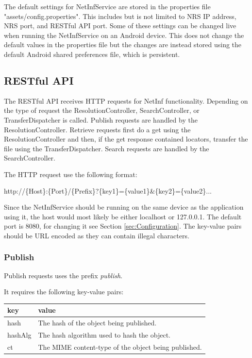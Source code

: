 The default settings for NetInfService are stored in the properties file "assets/config.properties". This includes but is not limited to NRS IP address, NRS port, and RESTful API port. Some of these settings can be changed live when running the NetInfService on an Android device. This does not change the default values in the properties file but the changes are instead stored using the default Android shared preferences file, which is persistent.

\subsection{RESTful API}
\label{sec:RESTful API}

The RESTful API receives HTTP requests for NetInf functionality. Depending on the type of request the ResolutionController, SearchController, or TransferDispatcher is called. Publish requests are handled by the ResolutionController. Retrieve requests first do a get using the ResolutionController and then, if the get response contained locators, transfer the file using the TransferDispatcher. Search requests are handled by the SearchController.

The HTTP request use the following format:

\begin{center}
http://\{Host\}:\{Port\}/\{Prefix\}?\{key1\}=\{value1\}\&\{key2\}=\{value2\}...
\end{center}

Since the NetInfService should be running on the same device as the application using it, the host would most likely be either localhost or 127.0.0.1. The default port is 8080, for changing it see Section \ref{sec:Configuration}. The key-value pairs should be URL encoded as they can contain illegal characters.

\subsubsection{Publish}

Publish requests uses the prefix \emph{publish}.

It requires the following key-value pairs:

\begin{tabular}{ | l | l | }
	\hline
	key & value  \\ \hline \hline
	hash & The hash of the object being published.  \\ \hline
	hashAlg & The hash algorithm used to hash the object. \\ \hline
	ct & The MIME content-type of the object being published. \\ \hline
\end{tabular}

